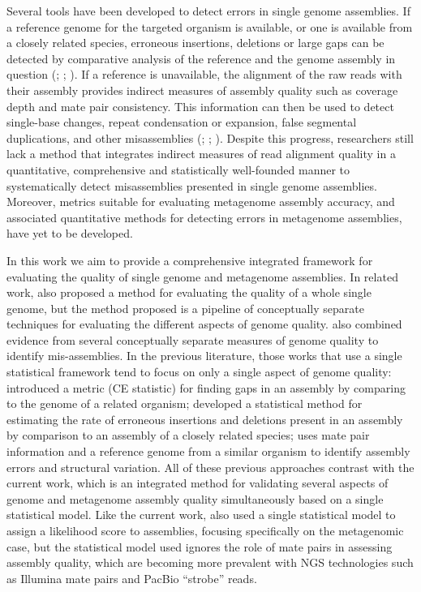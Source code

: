 \documentclass[phd,tocprelim]{cornell}
\begin{document}
Several tools have been developed to detect errors in single genome assemblies. If a reference genome for the targeted organism is available, or one is available from a closely related species, erroneous insertions, deletions or large gaps can be detected by comparative analysis of the reference and the genome assembly in question (\cite{Meader2010}; \cite{Salzberg2012}; \cite{Zimin2008}). If a reference is unavailable, the alignment of the raw reads with their assembly provides indirect measures of assembly quality such as coverage depth and mate pair consistency. This information can then be used to detect single-base changes, repeat condensation or expansion, false segmental duplications, and other misassemblies (\cite{Choi2008}; \cite{Phillippy2008}; \cite{Narzisi2011}). Despite this progress, researchers still lack a method that integrates indirect measures of read alignment quality in a quantitative, comprehensive and statistically well-founded manner to systematically detect misassemblies presented in single genome assemblies. Moreover, metrics suitable for evaluating metagenome assembly accuracy, and associated quantitative methods for detecting errors in metagenome assemblies, have yet to be developed.

In this work we aim to provide a comprehensive integrated framework for evaluating the quality of single genome and metagenome assemblies.  In related work, \cite{Phillippy2008} also proposed a method for evaluating the quality of a whole single genome, but the method proposed is a pipeline of conceptually separate techniques for evaluating the different aspects of genome quality.  \cite{Choi2008} also combined evidence from several conceptually separate measures of genome quality to identify mis-assemblies.  In the previous literature, those works that use a single statistical framework tend to focus on only a single aspect of genome quality: \cite{Zimin2008} introduced a metric (CE statistic) for finding gaps in an assembly by comparing to the genome of a related organism; \cite{Meader2010} developed a statistical method for estimating the rate of erroneous insertions and deletions present in an assembly by comparison to an assembly of a closely related species; \cite{Olson2009} uses mate pair information and a reference genome from a similar organism to identify assembly errors and structural variation.  All of these previous approaches contrast with the current work, which is an integrated method for validating several aspects of genome and metagenome assembly quality simultaneously based on a single statistical model.  Like the current work, \cite{Laserson2011} also used a single statistical model to assign a likelihood score to assemblies, focusing specifically on the metagenomic case, but the statistical model used ignores the role of mate pairs in assessing assembly quality, which are becoming more prevalent with NGS technologies such as Illumina mate pairs and PacBio “strobe” reads.
\end{document}
